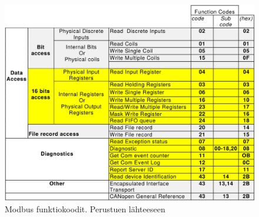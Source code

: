 \begin{figure}[h]
  \centering
  \includegraphics[width=1\textwidth]{figures/modbus_funktio_koodit}
  \caption[Modbus funktiokoodit]{Modbus funktiokoodit. Perustuen lähteeseen \parencite{modbusAppSpec}}
\end{figure}

